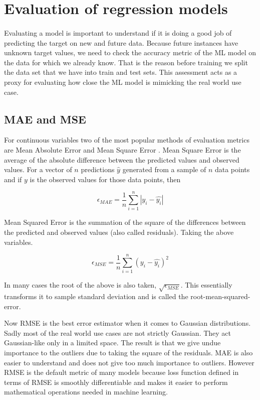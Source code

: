 \documentclass{book}
\begin{document}
\label{par:}

\label{sub:generalized_linear_models}

\section{Evaluation of regression models}%
\paragraph{}%
Evaluating a model is important to understand if it is doing a good job of predicting the target on new and future data. Because future instances have unknown target values, we need to check the accuracy metric of the ML model on the data for which we already know. That is the reason before training we split the data set that we have into train and test sets. This assessment acts as a proxy for evaluating how close the ML model is mimicking the real world use case.
\label{par:}

\subsection{MAE and MSE}%
For continuous variables two of the most popular methods of evaluation metrics are Mean Absolute Error and Mean Square Error\cite{WEBSITE:1} . Mean Square Error is the average of the absolute difference between the predicted values and observed values. For a vector of $n$ predictions $\hat{y}$ generated from a sample of $n$ data points and if $y$ is the observed values for those data points, then

\begin{equation}
	\epsilon_{MAE} = \frac{1}{n}\sum_{i=1}^{n}|y_i - \hat{y_i}|
\end{equation}

Mean Squared Error is the summation of the square of the differences between the predicted and observed values (also called residuals). Taking the above variables.

\begin{equation}
	\epsilon_{MSE} = \frac{1}{n}\sum_{i=1}^{n}(y_i - \hat{y_i})^2
\end{equation}

In many cases the root of the above is also taken, $\sqrt{\epsilon_{MSE}}$. This essentially transforms it to sample standard deviation and is called the root-mean-squared-error.

Now RMSE is the best error estimator when it comes to Gaussian distributions. Sadly most of the real world use cases are not strictly Gaussian. They act Gaussian-like only in a limited space. The result is that we give undue importance to the outliers due to taking the square of the residuals. MAE is also easier to understand and does not give too much importance to outliers. However RMSE is the default metric of many models because loss function defined in terms of RMSE is smoothly differentiable and makes it easier to perform mathematical operations needed in machine learning.
\end{document}
